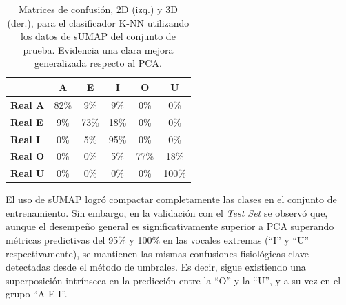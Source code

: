 \begin{table}[H]
\begin{minipage}{0.48\linewidth}
{\begin{tabular}{lccccc}
             & \textbf{A} & \textbf{E} & \textbf{I} & \textbf{O} & \textbf{U} \\
            \midrule
            \textbf{Real A} & \cellcolor[rgb]{0.43,0.43,1.00} \color{white} 82\% & \cellcolor[rgb]{0.94,0.94,1.00}  9\% & \cellcolor[rgb]{0.94,0.94,1.00}  9\% & \cellcolor[rgb]{1.00,1.00,1.00}  0\% & \cellcolor[rgb]{1.00,1.00,1.00}  0\% \\
            \textbf{Real E} & \cellcolor[rgb]{0.94,0.94,1.00}  9\% & \cellcolor[rgb]{0.49,0.49,1.00} \color{white} 73\% & \cellcolor[rgb]{0.87,0.87,1.00}  18\% & \cellcolor[rgb]{1.00,1.00,1.00}  0\% & \cellcolor[rgb]{1.00,1.00,1.00}  0\% \\
            \textbf{Real I} & \cellcolor[rgb]{1.00,1.00,1.00}  0\% & \cellcolor[rgb]{0.97,0.97,1.00}  5\% & \cellcolor[rgb]{0.33,0.33,1.00} \color{white} 95\% & \cellcolor[rgb]{1.00,1.00,1.00}  0\% & \cellcolor[rgb]{1.00,1.00,1.00}  0\% \\
            \textbf{Real O} & \cellcolor[rgb]{1.00,1.00,1.00}  0\% & \cellcolor[rgb]{1.00,1.00,1.00}  0\% & \cellcolor[rgb]{0.97,0.97,1.00}  5\% & \cellcolor[rgb]{0.46,0.46,1.00} \color{white} 77\% & \cellcolor[rgb]{0.87,0.87,1.00}  18\% \\
            \textbf{Real U} & \cellcolor[rgb]{1.00,1.00,1.00}  0\% & \cellcolor[rgb]{1.00,1.00,1.00}  0\% & \cellcolor[rgb]{1.00,1.00,1.00}  0\% & \cellcolor[rgb]{1.00,1.00,1.00}  0\% & \cellcolor[rgb]{0.30,0.30,1.00} \color{white} 100\% \\
            \bottomrule
            \end{tabular}%
        }
    \end{minipage}
    \caption{Matrices de confusión, 2D (izq.) y 3D (der.), para el clasificador K-NN utilizando los datos de sUMAP del conjunto de prueba. Evidencia una clara mejora generalizada respecto al PCA.}
    \label{tab:umap_confusion}
\end{table}

El uso de sUMAP logró compactar completamente las clases en el conjunto de entrenamiento. Sin embargo, en la validación con el \textit{Test Set} se observó que, aunque el desempeño general es significativamente superior a PCA superando métricas predictivas del 95\% y 100\% en las vocales extremas (\enquote{I} y \enquote{U} respectivamente), se mantienen las mismas confusiones fisiológicas clave detectadas desde el método de umbrales. Es decir, sigue existiendo una superposición intrínseca en la predicción entre la \enquote{O} y la \enquote{U}, y a su vez en el grupo \enquote{A-E-I}.

